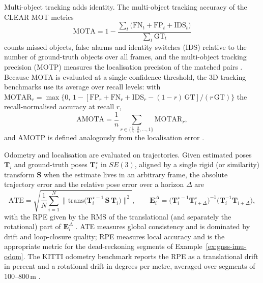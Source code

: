 \documentclass[graybox,envcountchap]{style/SNmono}
\begin{document}
Multi-object tracking adds identity. The multi-object tracking accuracy of the CLEAR MOT metrics
\begin{equation}
\mathrm{MOTA}=1-\frac{\sum_{t}\big(\mathrm{FN}_{t}+\mathrm{FP}_{t}+\mathrm{IDS}_{t}\big)}{\sum_{t}\mathrm{GT}_{t}}
\label{eq:mota}
\end{equation}
counts missed objects, false alarms and identity switches (IDS) relative to the number of ground-truth objects over all frames, and the multi-object tracking precision (MOTP) measures the localisation precision of the matched pairs \cite{bernardin2008_clearmot}. Because MOTA is evaluated at a single confidence threshold, the 3D tracking benchmarks use its average over recall levels: with $\mathrm{MOTAR}_{r}=\max\{0,\,1-[\mathrm{FP}_{r}+\mathrm{FN}_{r}+\mathrm{IDS}_{r}-(1-r)\,\mathrm{GT}]/(r\,\mathrm{GT})\}$ the recall-normalised accuracy at recall $r$,
\begin{equation}
\mathrm{AMOTA}=\frac{1}{n}\sum_{r\in\{\frac{1}{n},\frac{2}{n},\dots,1\}}\mathrm{MOTAR}_{r},
\label{eq:amota}
\end{equation}
and AMOTP is defined analogously from the localisation error \cite{weng2020_ab3dmot,caesar2020_nuscenes}.

Odometry and localisation are evaluated on trajectories. Given estimated poses $\mathbf{T}_{i}$ and ground-truth poses $\mathbf{T}_{i}^{\star}$ in $SE(3)$, aligned by a single rigid (or similarity) transform $\mathbf{S}$ when the estimate lives in an arbitrary frame, the absolute trajectory error and the relative pose error over a horizon $\Delta$ are
\begin{equation}
\mathrm{ATE}=\sqrt{\frac{1}{N}\sum_{i=1}^{N}\big\|\mathrm{trans}\big(\mathbf{T}_{i}^{\star-1}\,\mathbf{S}\,\mathbf{T}_{i}\big)\big\|^{2}},
\qquad
\mathbf{E}_{i}^{\Delta}=\big(\mathbf{T}_{i}^{\star-1}\mathbf{T}_{i+\Delta}^{\star}\big)^{-1}\big(\mathbf{T}_{i}^{-1}\mathbf{T}_{i+\Delta}\big),
\label{eq:ate-rpe}
\end{equation}
with the RPE given by the RMS of the translational (and separately the rotational) part of $\mathbf{E}_{i}^{\Delta}$ \cite{sturm2012_rgbd}. ATE measures global consistency and is dominated by drift and loop-closure quality; RPE measures local accuracy and is the appropriate metric for the dead-reckoning segments of Example~\ref{ex:gnss-imu-odom}. The KITTI odometry benchmark reports the RPE as a translational drift in percent and a rotational drift in degrees per metre, averaged over segments of $100$--$800$\,m \cite{geiger2013_kitti}.
\end{document}
